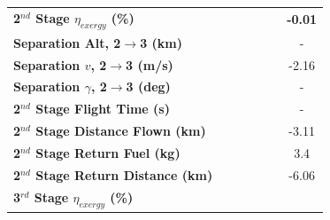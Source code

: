 \begin{table}[!ht]
\begin{tabular}{l c c c c c c}
		\hline 
		\textbf{2$^{nd}$ Stage $\eta_{exergy}$ (\%)}
		& \textbf{\secondExergyEffCdReturnNinety}
		& \textbf{\secondExergyEffCdReturnNinetyFive}
		& \textbf{\secondExergyEffCdReturnStandard}
		& \textbf{\secondExergyEffCdReturnOneHundredFive}
		& \textbf{\secondExergyEffCdReturnOneHundredTen}
		& \textbf{-0.01}
		\\
		\textbf{Separation Alt, 2$\rightarrow$3 (km)}
		& \secondthirdSeparationAltCdReturnNinety
		& \secondthirdSeparationAltCdReturnNinetyFive
		& \secondthirdSeparationAltCdReturnStandard
		& \secondthirdSeparationAltCdReturnOneHundredFive
		& \secondthirdSeparationAltCdReturnOneHundredTen
		& -
		\\
		\textbf{Separation $v$, 2$\rightarrow$3 (m/s)}
		& \secondthirdSeparationvCdReturnNinety
		& \secondthirdSeparationvCdReturnNinetyFive
		& \secondthirdSeparationvCdReturnStandard
		& \secondthirdSeparationvCdReturnOneHundredFive
		& \secondthirdSeparationvCdReturnOneHundredTen
		&-2.16
		\\
		\textbf{Separation $\gamma$, 2$\rightarrow$3 (deg)}
		& \secondthirdSeparationgammaCdReturnNinety
		& \secondthirdSeparationgammaCdReturnNinetyFive
		& \secondthirdSeparationgammaCdReturnStandard
		& \secondthirdSeparationgammaCdReturnOneHundredFive
		& \secondthirdSeparationgammaCdReturnOneHundredTen
		& -
		\\
		\textbf{2$^{nd}$ Stage Flight Time (s)}
		& \secondFlightTimeCdReturnNinety
		& \secondFlightTimeCdReturnNinetyFive
		& \secondFlightTimeCdReturnStandard
		& \secondFlightTimeCdReturnOneHundredFive
		& \secondFlightTimeCdReturnOneHundredTen
		& -
		\\
		\textbf{2$^{nd}$ Stage Distance Flown (km)}
		& \SecondDistCdReturnNinety
		& \SecondDistCdReturnNinetyFive
		& \SecondDistCdReturnStandard
		& \SecondDistCdReturnOneHundredFive
		& \SecondDistCdReturnOneHundredTen
		&-3.11
		\\
		\textbf{2$^{nd}$ Stage Return Fuel (kg)}
		& \returnFuelCdReturnNinety
		& \returnFuelCdReturnNinetyFive
		& \returnFuelCdReturnStandard
		& \returnFuelCdReturnOneHundredFive
		& \returnFuelCdReturnOneHundredTen
		&3.4
		\\
		\textbf{2$^{nd}$ Stage Return Distance (km)}
		& \returnDistCdReturnNinety
		& \returnDistCdReturnNinetyFive
		& \returnDistCdReturnStandard
		& \returnDistCdReturnOneHundredFive
		& \returnDistCdReturnOneHundredTen
		&-6.06
		\\
		\hline 
		\textbf{3$^{rd}$ Stage $\eta_{exergy}$ (\%)}
		& \textbf{\thirddExergyEffCdReturnNinety}
		& \textbf{\thirddExergyEffCdReturnNinetyFive}

\end{tabular}
\end{table}
